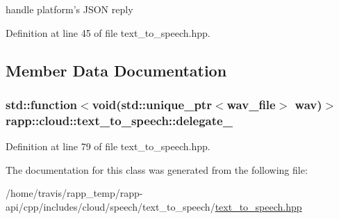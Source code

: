 handle platform's J\-S\-O\-N reply 



Definition at line 45 of file text\-\_\-to\-\_\-speech.\-hpp.



\subsection{Member Data Documentation}
\hypertarget{classrapp_1_1cloud_1_1text__to__speech_ae8a699bb3ef79a4af941d4baddaadc7b}{
\subsubsection[{delegate\-\_\-}]{\setlength{\rightskip}{0pt plus 5cm}std\-::function$<$void(std\-::unique\-\_\-ptr$<${\bf wav\-\_\-file}$>$ wav)$>$ rapp\-::cloud\-::text\-\_\-to\-\_\-speech\-::delegate\-\_\-\hspace{0.3cm}{\ttfamily [private]}}}\label{classrapp_1_1cloud_1_1text__to__speech_ae8a699bb3ef79a4af941d4baddaadc7b}


Definition at line 79 of file text\-\_\-to\-\_\-speech.\-hpp.



The documentation for this class was generated from the following file\-:\begin{DoxyCompactItemize}
\item 
/home/travis/rapp\-\_\-temp/rapp-\/api/cpp/includes/cloud/speech/text\-\_\-to\-\_\-speech/\hyperlink{text__to__speech_8hpp}{text\-\_\-to\-\_\-speech.\-hpp}\end{DoxyCompactItemize}
